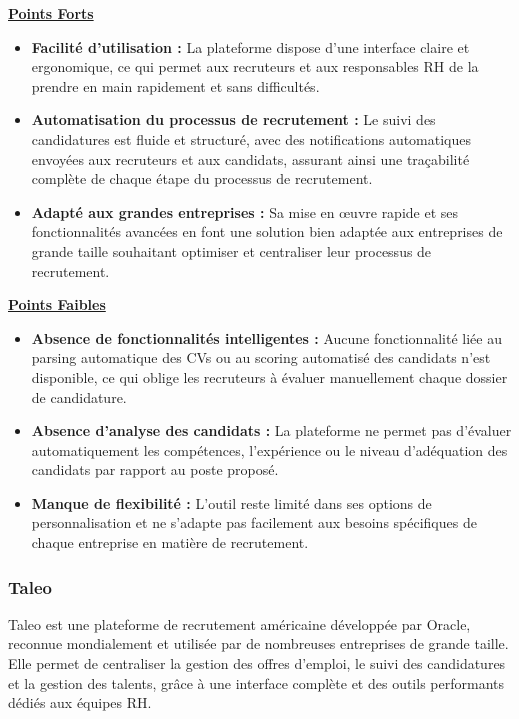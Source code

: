 \par \underline{\textbf{Points Forts}}\\
\begin{itemize}[label=\textbullet]
\item[\ding{51}]  \textbf{Facilité d'utilisation :} La plateforme dispose d'une interface claire et ergonomique, ce qui permet aux recruteurs et aux responsables RH de la prendre en main rapidement et sans difficultés.
\item[\ding{51}]  \textbf{Automatisation du processus de recrutement : } Le suivi des candidatures est fluide et structuré, avec des notifications automatiques envoyées aux recruteurs et aux candidats, assurant ainsi une traçabilité complète de chaque étape du processus de recrutement.
\item[\ding{51}]  \textbf{Adapté aux grandes entreprises :} Sa mise en œuvre rapide et ses fonctionnalités avancées en font une solution bien adaptée aux entreprises de grande taille souhaitant optimiser et centraliser leur processus de recrutement.
\end{itemize}

\par \underline{\textbf{Points Faibles}}\\
\begin{itemize}[label=\textbullet]
\item[\ding{56}]  \textbf{Absence de fonctionnalités intelligentes : }Aucune fonctionnalité liée au parsing automatique des CVs ou au scoring automatisé des candidats n'est disponible, ce qui oblige les recruteurs à évaluer manuellement chaque dossier de candidature.
\item[\ding{56}]  \textbf{Absence d'analyse des candidats :}  La plateforme ne permet pas d'évaluer automatiquement les compétences, l'expérience ou le niveau d'adéquation des candidats par rapport au poste proposé.
\item[\ding{56}]  \textbf{Manque de flexibilité : } L'outil reste limité dans ses options de personnalisation et ne s'adapte pas facilement aux besoins spécifiques de chaque entreprise en matière de recrutement.

\end{itemize}

\subsubsection{ Taleo  }
Taleo est une plateforme de recrutement américaine développée par Oracle, reconnue mondialement et utilisée par de nombreuses entreprises de grande taille. Elle permet de centraliser la gestion des offres d'emploi, le suivi des candidatures et la gestion des talents, grâce à une interface complète et des outils performants dédiés aux équipes RH.
\cite{Taleo}
\vspace{0.3cm}

